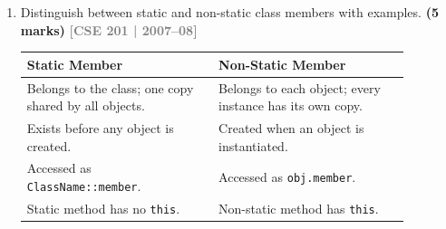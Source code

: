 \documentclass[12pt,a3paper]{article}
\newcommand{\yr}[1]{\hfill\textcolor{gray}{\small\textbf{[#1]}}}
\newcommand{\mk}[1]{\textcolor{orange!70!black}{\small\textbf{(#1 marks)}}}
\begin{document}
\begin{enumerate}
\begin{tcolorbox}[enhanced,breakable,ansbox,colback=cD!4,colframe=cD,
  boxrule=0.8pt,arc=5pt,
  title={\textbf{Answer --- Can friend function overload assignment operator?}},
  fonttitle=\bfseries\color{white},colbacktitle=cD]

\textbf{False.} A friend function \textbf{cannot} overload
\texttt{operator=}.

The C++ standard requires \texttt{=}, \texttt{[]}, \texttt{()},
and \texttt{->} to be overloaded as \textbf{member functions} only.

For \texttt{a = b}, the left operand must be the implicit
\texttt{this} object --- only possible with a member function.  A
friend has no \texttt{this} and therefore cannot serve as the
assignment operator:

\begin{lstlisting}[language=C++]
class MyClass {
    int val;
public:
    MyClass(int v) : val(v) {}
    // CORRECT: member function
    MyClass& operator=(const MyClass& rhs) {
        val = rhs.val;
        return *this;
    }
    // friend MyClass& operator=(...) -- ILLEGAL, compile error
};
\end{lstlisting}

\end{tcolorbox}

\item Distinguish between static and non-static class members with examples. \mk{5}
\yr{CSE 201 | 2007--08}


\begin{tcolorbox}[enhanced,breakable,ansbox,colback=cD!4,colframe=cD,
  boxrule=0.8pt,arc=5pt,
  title={\textbf{Answer --- Static vs non-static class members}},
  fonttitle=\bfseries\color{white},colbacktitle=cD]

\begin{center}
\small
\begin{tabular}{@{}p{0.44\linewidth}p{0.44\linewidth}@{}}
\toprule
\textbf{Static Member} & \textbf{Non-Static Member} \\
\midrule
Belongs to the class; one copy
shared by all objects. &
Belongs to each object; every
instance has its own copy. \\[3pt]
Exists before any object is created. &
Created when an object is instantiated. \\[3pt]
Accessed as \texttt{ClassName::member}. &
Accessed as \texttt{obj.member}. \\[3pt]
Static method has no \texttt{this}. &
Non-static method has \texttt{this}. \\
\bottomrule
\end{tabular}
\end{center}


\end{tcolorbox}
\end{enumerate}
\end{document}
